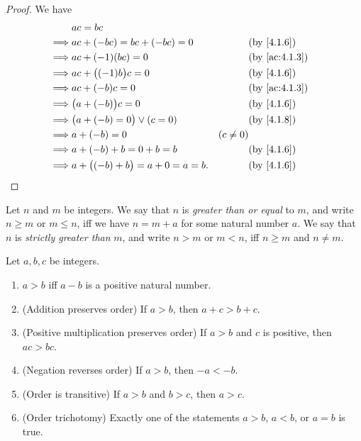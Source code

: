 \begin{proof}
  We have
  \begin{align*}
             & ac = bc                                                              \\
    \implies & ac + (-bc) = bc + (-bc) = 0             &            & \by{4.1.6}    \\
    \implies & ac + (-1)(bc) = 0                       &            & \by{ac:4.1.3} \\
    \implies & ac + \big((-1)b\big)c = 0               &            & \by{4.1.6}    \\
    \implies & ac + (-b)c = 0                          &            & \by{ac:4.1.3} \\
    \implies & \big(a + (-b)\big)c = 0                 &            & \by{4.1.6}    \\
    \implies & \big(a + (-b) = 0\big) \lor (c = 0)     &            & \by{4.1.8}    \\
    \implies & a + (-b) = 0                            & (c \neq 0)                 \\
    \implies & a + (-b) + b = 0 + b = b                &            & \by{4.1.6}    \\
    \implies & a + \big((-b) + b\big) = a + 0 = a = b. &            & \by{4.1.6}
  \end{align*}
\end{proof}

\begin{defn}\label{4.1.10}
  Let \(n\) and \(m\) be integers.
  We say that \(n\) is \emph{greater than or equal} to \(m\), and write \(n \geq m\) or \(m \leq n\), iff we have \(n = m + a\) for some natural number \(a\).
  We say that \(n\) is \emph{strictly greater than} \(m\), and write \(n > m\) or \(m < n\), iff \(n \geq m\) and \(n \neq m\).
\end{defn}

\begin{lem}\label{4.1.11}
  Let \(a, b, c\) be integers.
  \begin{enumerate}
    \item \(a > b\) iff \(a - b\) is a positive natural number.
    \item (Addition preserves order) If \(a > b\), then \(a + c > b + c\).
    \item (Positive multiplication preserves order) If \(a > b\) and \(c\) is positive, then \(ac > bc\).
    \item (Negation reverses order) If \(a > b\), then \(-a < -b\).
    \item (Order is transitive) If \(a > b\) and \(b > c\), then \(a > c\).
    \item (Order trichotomy) Exactly one of the statements \(a > b\), \(a < b\), or \(a = b\) is true.
  \end{enumerate}
\end{lem}

